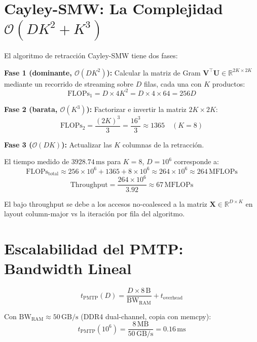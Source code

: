 \section{Cayley-SMW: La Complejidad $\mathcal{O}(DK^2 + K^3)$}

El algoritmo de retracción Cayley-SMW tiene dos fases:

\textbf{Fase 1 (dominante, $\mathcal{O}(DK^2)$):} Calcular la matriz de Gram $\mathbf{V}^\top\mathbf{U} \in \mathbb{R}^{2K \times 2K}$
mediante un recorrido de streaming sobre $D$ filas, cada una con $K$ productos:
\begin{equation}
\text{FLOPs}_1 = D \times 4K^2 = D \times 4 \times 64 = 256D
\end{equation}

\textbf{Fase 2 (barata, $\mathcal{O}(K^3)$):} Factorizar e invertir la matriz $2K \times 2K$:
\begin{equation}
\text{FLOPs}_2 = \frac{(2K)^3}{3} = \frac{16^3}{3} \approx 1365 \quad (K=8)
\end{equation}

\textbf{Fase 3 ($\mathcal{O}(DK)$):} Actualizar las $K$ columnas de la retracción.

El tiempo medido de $3928.74\,\text{ms}$ para $K=8$, $D=10^6$ corresponde a:
\begin{equation}
\text{FLOPs}_{\text{total}} \approx 256 \times 10^6 + 1365 + 8 \times 10^6 \approx 264 \times 10^6 \approx 264\,\text{MFLOPs}
\end{equation}
\begin{equation}
\text{Throughput} = \frac{264 \times 10^6}{3.92} \approx 67\,\text{MFLOPs}
\end{equation}

El bajo throughput se debe a los accesos no-coalesced a la matriz $\mathbf{X} \in \mathbb{R}^{D \times K}$
en layout column-major vs la iteración por fila del algoritmo.

\section{Escalabilidad del PMTP: Bandwidth Lineal}

\begin{equation}
t_{\text{PMTP}}(D) = \frac{D \times 8\,\text{B}}{\text{BW}_{\text{RAM}}} + t_{\text{overhead}}
\end{equation}

Con $\text{BW}_{\text{RAM}} \approx 50\,\text{GB/s}$ (DDR4 dual-channel, copia con memcpy):
\begin{equation}
t_{\text{PMTP}}(10^6) = \frac{8\,\text{MB}}{50\,\text{GB/s}} = 0.16\,\text{ms}
\end{equation}

